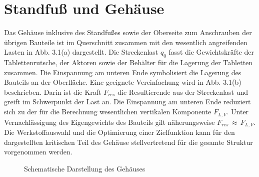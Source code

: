 \section{Standfuß und Gehäuse}\label{section:3.1}
Das Gehäuse inklusive des Standfußes sowie der Oberseite zum Anschrauben der übrigen Bauteile ist im Querschnitt zusammen mit den wesentlich angreifenden Lasten in Abb. 3.1(a) dargestellt. Die Streckenlast $q_0$ fasst die Gewichtskräfte der Tablettenrutsche, der Aktoren sowie der Behälter für die Lagerung der Tabletten zusammen. Die Einspannung am unteren Ende symbolisiert die Lagerung des Bauteils an der Oberfläche. Eine geeignete Vereinfachung wird in Abb. 3.1(b) beschrieben. Darin ist die Kraft $F_{res}$ die Resultierende aus der Streckenlast und greift im Schwerpunkt der Last an. Die Einspannung am unteren Ende reduziert sich zu der für die Berechnung wesentlichen vertikalen Komponente $F_{L,V}$. Unter Vernachlässigung des Eigengewichts des Bauteils gilt näherungsweise $F_{res}\,\approx\,F_{L,V}$. Die Werkstoffauswahl und die Optimierung einer Zielfunktion kann für den dargestellten kritischen Teil des Gehäuse stellvertretend für die gesamte Struktur vorgenommen werden.
\begin{figure}[H]
	\centering
	\label{fig:0301skizzea}
	\qquad
	\label{fig:0301skizzeb}
	\caption{Schematische Darstellung des Gehäuses}
\end{figure}
